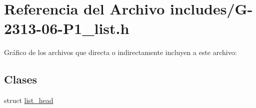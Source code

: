 \hypertarget{G-2313-06-P1__list_8h}{}\section{Referencia del Archivo includes/\+G-\/2313-\/06-\/\+P1\+\_\+list.h}
\label{G-2313-06-P1__list_8h}
Gráfico de los archivos que directa o indirectamente incluyen a este archivo\+:
\subsection*{Clases}
\begin{DoxyCompactItemize}
\item 
struct \hyperlink{structlist__head}{list\+\_\+head}
\end{DoxyCompactItemize}
